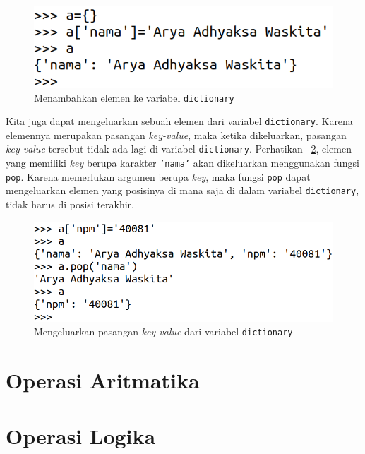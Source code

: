 \begin{figure}[h!]
  \begin{center}
    \includegraphics[scale=1.25]{pics/dictionary.png}
    \caption{Menambahkan elemen ke variabel \texttt{dictionary}}
    \label{fig:dict}
  \end{center}
\end{figure}

Kita juga dapat mengeluarkan sebuah elemen dari variabel \texttt{dictionary}. Karena elemennya merupakan pasangan \textit{key-value}, maka ketika dikeluarkan, pasangan \textit{key-value} tersebut tidak ada lagi di variabel \texttt{dictionary}. Perhatikan \figurename~\ref{fig:popDict}, elemen yang memiliki \textit{key} berupa karakter \texttt{'nama'} akan dikeluarkan menggunakan fungsi \texttt{pop}. Karena memerlukan argumen berupa \textit{key}, maka fungsi \texttt{pop} dapat mengeluarkan elemen yang posisinya di mana saja di dalam variabel \texttt{dictionary}, tidak harus di posisi terakhir.  

\begin{figure}
  \begin{center}
    \includegraphics[scale=1.25]{pics/popDict.png}
    \caption{Mengeluarkan pasangan \textit{key-value} dari variabel \texttt{dictionary}}
    \label{fig:popDict}
  \end{center}
\end{figure}

\section{Operasi Aritmatika}
\section{Operasi Logika}
